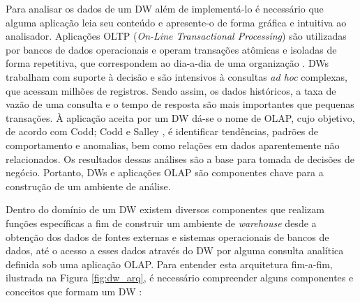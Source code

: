 Para analisar os dados de um DW além de implementá-lo é necessário que alguma aplicação leia seu conteúdo e apresente-o de forma gráfica e intuitiva ao analisador. Aplicações OLTP (\textit{On-Line Transactional Processing}) são utilizadas por bancos de dados operacionais e operam transações atômicas e isoladas de forma repetitiva, que correspondem ao dia-a-dia de uma organização \cite{chaudhuri1997overview}. DWs trabalham com suporte à decisão e são intensivos à consultas \textit{ad hoc} complexas, que acessam milhões de registros. Sendo assim, os dados históricos, a taxa de vazão de uma consulta e o tempo de resposta são mais importantes que pequenas transações. À aplicação aceita por um DW dá-se o nome de OLAP, cujo objetivo, de acordo com Codd; Codd e Salley \cite{codd1998providing}, é identificar tendências, padrões de comportamento e anomalias, bem como relações em dados aparentemente não relacionados. Os resultados dessas análises são a base para tomada de decisões de negócio. Portanto, DWs e aplicações OLAP são componentes chave para a construção de um ambiente de análise.

Dentro do domínio de um DW existem diversos componentes que realizam funções específicas a fim de construir um ambiente de \textit{warehouse} desde a obtenção dos dados de fontes externas e sistemas operacionais de bancos de dados, até o acesso a esses dados através do DW por alguma consulta analítica definida sob uma aplicação OLAP. Para entender esta arquitetura fim-a-fim, ilustrada na Figura \ref{fig:dw_arq}, é necessário compreender alguns componentes e conceitos que formam um DW \cite{kimball2002dw}:

